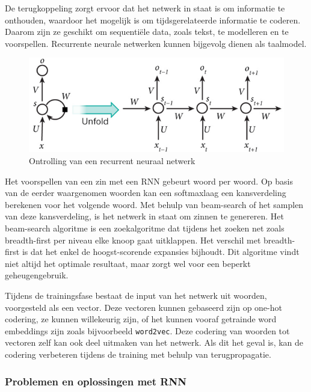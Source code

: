 De terugkoppeling zorgt ervoor dat het netwerk in staat is om informatie te onthouden, waardoor het mogelijk is om tijdsgerelateerde informatie te coderen. Daarom zijn ze geschikt om sequenti\"ele data, zoals tekst, te modelleren en te voorspellen. Recurrente neurale netwerken kunnen bijgevolg dienen als taalmodel\cite{Mikolov2010}.

\begin{figure}[tb]
    \centering
    \includegraphics[width=\linewidth]{Images/rnn.PNG}
    \caption{Ontrolling van een recurrent neuraal netwerk\cite{RNNTutorial}}
    \label{fig:rnn}
\end{figure}

Het voorspellen van een zin met een RNN gebeurt woord per woord. Op basis van de eerder waargenomen woorden kan een softmaxlaag een kansverdeling berekenen voor het volgende woord. Met behulp van beam-search of het samplen van deze kansverdeling, is het netwerk in staat om zinnen te genereren. Het beam-search algoritme is een zoekalgoritme dat tijdens het zoeken net zoals breadth-first per niveau elke knoop gaat uitklappen. Het verschil met breadth-first is dat het enkel de hoogst-scorende expansies bijhoudt. Dit algoritme vindt niet altijd het optimale resultaat, maar zorgt wel voor een beperkt geheugengebruik.

Tijdens de trainingsfase bestaat de input van het netwerk uit woorden, voorgesteld als een vector. Deze vectoren kunnen gebaseerd zijn op one-hot codering, ze kunnen willekeurig zijn, of het kunnen vooraf getrainde word embeddings zijn zoals bijvoorbeeld \texttt{word2vec}\cite{Mikolov2013}. Deze codering van woorden tot vectoren zelf kan ook deel uitmaken van het netwerk. Als dit het geval is, kan de codering verbeteren tijdens de training met behulp van terugpropagatie.

\subsubsection{Problemen en oplossingen met RNN}

